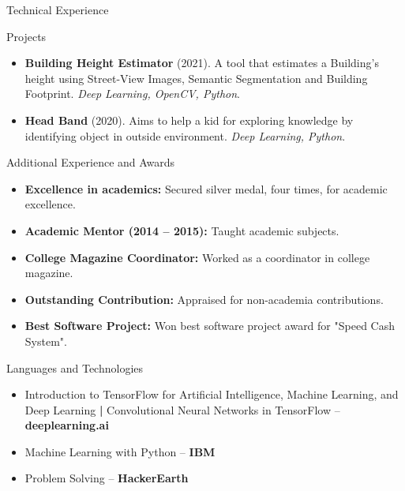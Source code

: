 \documentclass[]{shivshakti}
\begin{document}
	\begin{cvsection}{Technical Experience}
		\begin{cvsubsection}{Projects}{}{}
			\begin{itemize}
				\item \textbf{Building Height Estimator} (2021). A tool that estimates a Building's height using Street-View Images, Semantic Segmentation and Building Footprint. \emph{Deep Learning, OpenCV, Python}.
				\item \textbf{Head Band} (2020). Aims to help a kid for exploring knowledge by identifying object in outside environment. \emph{ Deep Learning, Python}.
			\end{itemize}
		\end{cvsubsection}
	\end{cvsection}
	
	\begin{cvsection}{Additional Experience and Awards}
		\begin{cvsubsection}{}{}{}	
			\begin{itemize}
				\item \textbf{Excellence in academics:} Secured silver medal, four times, for academic excellence.
				\item \textbf{Academic Mentor (2014 – 2015):} Taught academic subjects. 
				\item \textbf{College Magazine Coordinator:} Worked as a coordinator in college magazine.
				\item \textbf{Outstanding Contribution:} Appraised for non-academia contributions.
				\item \textbf{Best Software Project:} Won best software project award for "Speed Cash System".
			\end{itemize}
		\end{cvsubsection}
	\end{cvsection}
	
	\begin{cvsection}{Languages and Technologies}
		\begin{cvsubsection}{}{}{}	
			\begin{itemize}
				\item Introduction to TensorFlow for Artificial Intelligence, Machine Learning, and Deep Learning \textbf{|} Convolutional Neural Networks in TensorFlow -- \textbf{deeplearning.ai}
				\item  Machine Learning with Python -- \textbf{IBM}
				\item Problem Solving -- \textbf{HackerEarth}
			\end{itemize}
		\end{cvsubsection}
	\end{cvsection}
	
\end{document}
